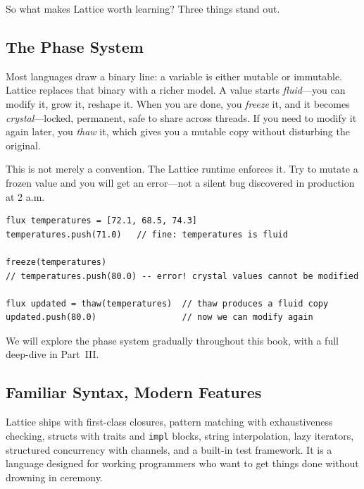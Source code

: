 So what makes Lattice worth learning?
Three things stand out.

\subsection{The Phase System}\label{subsec:phase-promise}

Most languages draw a binary line: a variable is either mutable or immutable.
Lattice replaces that binary with a richer model.
A value starts \emph{fluid}---you can modify it, grow it, reshape it.
When you are done, you \emph{freeze} it, and it becomes \emph{crystal}---locked, permanent, safe to share across threads.
If you need to modify it again later, you \emph{thaw} it, which gives you a mutable copy without disturbing the original.

This is not merely a convention.
The Lattice runtime enforces it.
Try to mutate a frozen value and you will get an error---not a silent bug discovered in production at 2 a.m.

\begin{lstlisting}[language=Lattice, caption={Freezing and thawing}]
flux temperatures = [72.1, 68.5, 74.3]
temperatures.push(71.0)   // fine: temperatures is fluid

freeze(temperatures)
// temperatures.push(80.0) -- error! crystal values cannot be modified

flux updated = thaw(temperatures)  // thaw produces a fluid copy
updated.push(80.0)                 // now we can modify again
\end{lstlisting}

We will explore the phase system gradually throughout this book, with a full deep-dive in Part~III\@.

\subsection{Familiar Syntax, Modern Features}\label{subsec:modern-features}

Lattice ships with first-class closures, pattern matching with exhaustiveness checking, structs with traits and \lstinline|impl| blocks, string interpolation, lazy iterators, structured concurrency with channels, and a built-in test framework.
It is a language designed for working programmers who want to get things done without drowning in ceremony.

